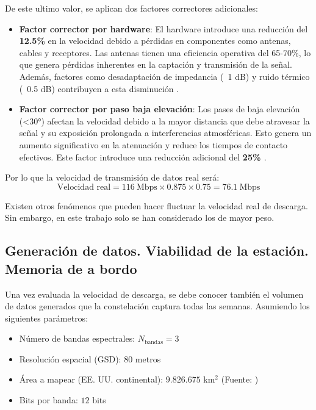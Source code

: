 De este ultimo valor, se aplican dos factores correctores adicionales:
\begin{itemize}
    \item \textbf{Factor corrector por hardware}: El hardware introduce una reducción del \textbf{12.5\%} en la velocidad debido a pérdidas en componentes como antenas, cables y receptores. Las antenas tienen una eficiencia operativa del 65-70\%, lo que genera pérdidas inherentes en la captación y transmisión de la señal. Además, factores como desadaptación de impedancia (~1 dB) y ruido térmico (~0.5 dB) contribuyen a esta disminución \cite{altunc_xband_cubesat_2016}.
    \item \textbf{Factor corrector por paso baja elevación}:
    Los pases de baja elevación (\textless 30°) afectan la velocidad debido a la mayor distancia que debe atravesar la señal y su exposición prolongada a interferencias atmosféricas. Esto genera un aumento significativo en la atenuación y reduce los tiempos de contacto efectivos. Este factor introduce una reducción adicional del \textbf{25\% \cite{satellite_coordinates_look_angles}}.
\end{itemize}

Por lo que la velocidad de transmisión de datos real será:
$$
\text{Velocidad real} = 116\ \text{Mbps} \times 0.875 \times 0.75 = \boxed{76.1\ \text{Mbps}}
$$

Existen otros fenómenos que pueden hacer fluctuar la velocidad real de descarga. Sin embargo, en este trabajo solo se han considerado los de mayor peso.

\subsection{Generación de datos. Viabilidad de la estación. Memoria de a bordo}

Una vez evaluada la velocidad de descarga, se debe conocer también el volumen de datos generados que la constelación captura todas las semanas. Asumiendo los siguientes parámetros:

\begin{itemize}
\item Número de bandas espectrales: $N_{\text{bandas}} = 3$
\item Resolución espacial (GSD): $80$ metros
\item Área a mapear (EE. UU. continental): $9.826.675$ km$^2$ (Fuente: \cite{cia_worldfactbook_usa_area})
\item Bits por banda: $12$ bits
\end{itemize}

